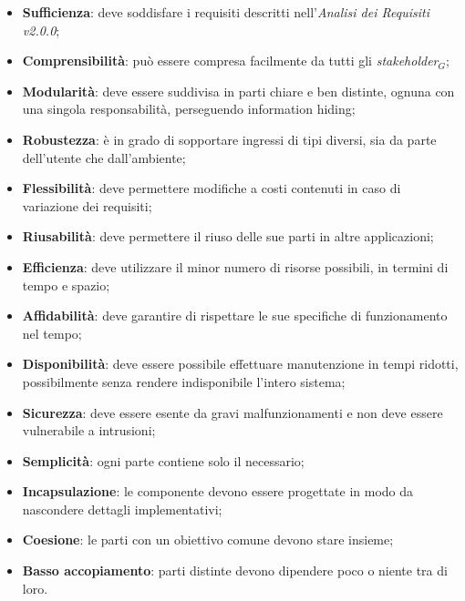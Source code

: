 \begin{itemize}
	\item \textbf{Sufficienza}: deve soddisfare i requisiti descritti nell'\textit{Analisi dei Requisiti v2.0.0};
	\item \textbf{Comprensibilità}: può essere compresa facilmente da tutti gli \textit{stakeholder$_{G}$};
	\item \textbf{Modularità}: deve essere suddivisa in parti chiare e ben distinte, ognuna con una singola responsabilità, perseguendo information hiding;
	\item \textbf{Robustezza}: è in grado di sopportare ingressi di tipi diversi, sia da parte dell'utente che dall'ambiente;
	\item \textbf{Flessibilità}: deve permettere modifiche a costi contenuti in caso di variazione dei requisiti;
	\item \textbf{Riusabilità}: deve permettere il riuso delle sue parti in altre applicazioni;
	\item \textbf{Efficienza}: deve utilizzare il minor numero di risorse possibili, in termini di tempo e spazio;
	\item \textbf{Affidabilità}: deve garantire di rispettare le sue specifiche di funzionamento nel tempo;
	\item \textbf{Disponibilità}: deve essere possibile effettuare manutenzione in tempi ridotti, possibilmente senza rendere indisponibile l'intero sistema;
	\item \textbf{Sicurezza}: deve essere esente da gravi malfunzionamenti e non deve essere vulnerabile a intrusioni;
	\item \textbf{Semplicità}: ogni parte contiene solo il necessario;
	\item \textbf{Incapsulazione}: le componente devono essere progettate in modo da nascondere dettagli implementativi;
	\item \textbf{Coesione}: le parti con un obiettivo comune devono stare insieme;
	\item \textbf{Basso accopiamento}: parti distinte devono dipendere poco o niente tra di loro.
\end{itemize}
